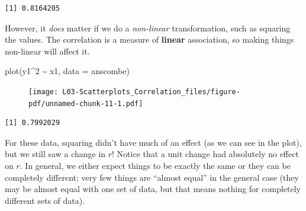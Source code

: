 \documentclass[
  letterpaper,
  DIV=11,
  numbers=noendperiod]{scrreprt}
\newenvironment{Shaded}{\begin{snugshade}}{\end{snugshade}}
\newcommand{\AttributeTok}[1]{\textcolor[rgb]{0.40,0.45,0.13}{#1}}
\newcommand{\DecValTok}[1]{\textcolor[rgb]{0.68,0.00,0.00}{#1}}
\newcommand{\FunctionTok}[1]{\textcolor[rgb]{0.28,0.35,0.67}{#1}}
\newcommand{\NormalTok}[1]{\textcolor[rgb]{0.00,0.23,0.31}{#1}}
\newcommand{\SpecialCharTok}[1]{\textcolor[rgb]{0.37,0.37,0.37}{#1}}
\begin{document}
\begin{Shaded}
\end{Shaded}

\begin{verbatim}
[1] 0.8164205
\end{verbatim}

However, it \emph{does} matter if we do a \emph{non-linear}
transformation, such as squaring the values. The correlation is a
measure of \textbf{linear} association, so making things non-linear will
affect it.

\begin{Shaded}
\begin{Highlighting}[]
\FunctionTok{plot}\NormalTok{(y1}\SpecialCharTok{\^{}}\DecValTok{2} \SpecialCharTok{\textasciitilde{}}\NormalTok{ x1, }\AttributeTok{data =}\NormalTok{ anscombe)}
\end{Highlighting}
\end{Shaded}

\begin{figure}[H]

{\centering \texttt{[image: L03-Scatterplots\_Correlation\_files/figure-pdf/unnamed-chunk-11-1.pdf]}

}

\end{figure}

\begin{Shaded}
\end{Shaded}

\begin{verbatim}
[1] 0.7992029
\end{verbatim}

For these data, squaring didn't have much of an effect (as we can see in
the plot), but we still saw a change in \(r\)! Notice that a unit change
had absolutely no effect on \(r\). In general, we either expect things
to be exactly the same or they can be completely different; very few
things are ``almost equal'' in the general case (they may be almost
equal with one set of data, but that means nothing for completely
different sets of data).
\end{document}
